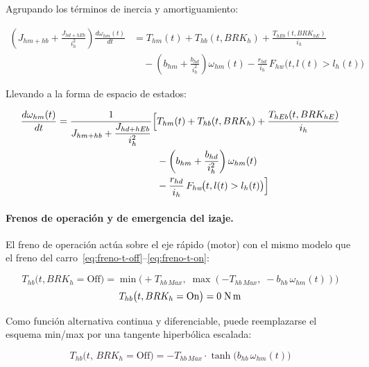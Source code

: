 \documentclass[12pt, a4paper]{article}
\begin{document}
Agrupando los términos de inercia y amortiguamiento:

\begin{equation}
\begin{split}
    \left(J_{hm+hb}+\frac{J_{hd+hEb}}{i_h^2}\right)\frac{d\omega_{hm}(t)}{dt}
    &= T_{hm}(t) + T_{hb}(t,BRK_h) + \frac{T_{hEb}(t,BRK_{hE})}{i_h} \\[4pt]
    &\quad - \left(b_{hm}+\frac{b_{hd}}{i_h^2}\right)\omega_{hm}(t)
             - \frac{r_{hd}}{i_h}\,F_{hw}\!\bigl(t,l(t) > l_h(t)\bigr)
\end{split}
\end{equation}

Llevando a la forma de espacio de estados:

\begin{equation}
    \label{eq:acc-hoist-ede}
\begin{split}
    \frac{d\omega_{hm}(t)}{dt} = \frac{1}{J_{hm+hb}+\dfrac{J_{hd+hEb}}{i_h^2}}
    \Bigl[&T_{hm}(t) + T_{hb}(t,BRK_h) + \frac{T_{hEb}(t,BRK_{hE})}{i_h} \\
          &- \left(b_{hm}+\frac{b_{hd}}{i_h^2}\right)\omega_{hm}(t) \\
          &- \frac{r_{hd}}{i_h}\,F_{hw}\!\bigl(t,l(t)>l_h(t)\bigr)\Bigr]
\end{split}
\end{equation}

\paragraph{Frenos de operación y de emergencia del izaje.}

El freno de operación actúa sobre el eje rápido (motor) con el mismo modelo que el
freno del carro~\eqref{eq:freno-t-off}--\eqref{eq:freno-t-on}:

\begin{equation}
    \label{eq:freno-h-off}
    T_{hb}\bigl(t,BRK_h = \text{Off}\bigr)
    = \min\!\bigl(+T_{hb\,Max},\;\max(-T_{hb\,Max},\;-b_{hb}\,\omega_{hm}(t))\bigr)
\end{equation}
\begin{equation}
    \label{eq:freno-h-on}
    T_{hb}\bigl(t,BRK_h = \text{On}\bigr) = 0\;\text{N\,m}
\end{equation}

\noindent Como función alternativa continua y diferenciable, puede reemplazarse el esquema min/max por una tangente hiperbólica escalada:

\begin{equation}
    \label{eq:freno-h-off-tanh}
    T_{hb}\bigl(t,\,BRK_h = \text{Off}\bigr) = -T_{hb\,Max}\cdot\tanh\!\bigl(b_{hb}\,\omega_{hm}(t)\bigr)
\end{equation}
\end{document}
